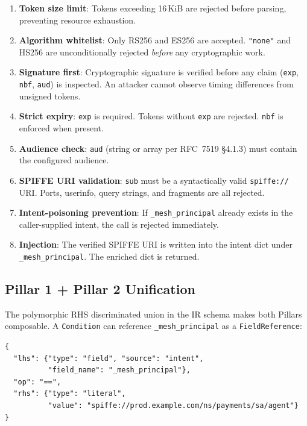 \documentclass[12pt,a4paper,oneside]{report}
\newcommand{\code}[1]{\texttt{#1}}           %
\begin{document}
\begin{enumerate}
  \item \textbf{Token size limit}: Tokens exceeding 16\,KiB are rejected
        before parsing, preventing resource exhaustion.
  \item \textbf{Algorithm whitelist}: Only RS256 and ES256 are accepted.
        \code{"none"} and HS256 are unconditionally rejected \emph{before}
        any cryptographic work.
  \item \textbf{Signature first}: Cryptographic signature is verified before
        any claim (\code{exp}, \code{nbf}, \code{aud}) is inspected.
        An attacker cannot observe timing differences from unsigned tokens.
  \item \textbf{Strict expiry}: \code{exp} is required.  Tokens without
        \code{exp} are rejected.  \code{nbf} is enforced when present.
  \item \textbf{Audience check}: \code{aud} (string or array per RFC~7519
        \S4.1.3) must contain the configured audience.
  \item \textbf{SPIFFE URI validation}: \code{sub} must be a syntactically
        valid \code{spiffe://} URI.  Ports, userinfo, query strings, and
        fragments are all rejected.
  \item \textbf{Intent-poisoning prevention}: If \code{\_mesh\_principal}
        already exists in the caller-supplied intent, the call is rejected
        immediately.
  \item \textbf{Injection}: The verified SPIFFE URI is written into the intent
        dict under \code{\_mesh\_principal}.  The enriched dict is returned.
\end{enumerate}

\subsection{Pillar 1 + Pillar 2 Unification}

The polymorphic RHS discriminated union in the IR schema makes both Pillars
composable.  A \code{Condition} can reference \code{\_mesh\_principal} as a
\code{FieldReference}:

\begin{lstlisting}[style=plain]
{
  "lhs": {"type": "field", "source": "intent",
          "field_name": "_mesh_principal"},
  "op": "==",
  "rhs": {"type": "literal",
          "value": "spiffe://prod.example.com/ns/payments/sa/agent"}
}
\end{lstlisting}
\end{document}
